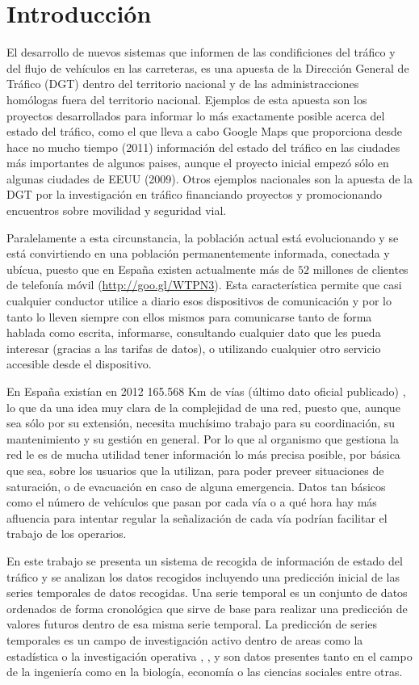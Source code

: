 \documentclass[runningheads]{llncs}
\begin{document}
\section{Introducci\'on}
\noindent 
El desarrollo de nuevos sistemas que informen de las condificiones del tráfico y del flujo de
veh\'iculos en las carreteras, es una apuesta de la Dirección General de Tráfico (DGT) dentro del
territorio nacional y de las administracciones homólogas fuera del territorio nacional. Ejemplos de
esta apuesta son los proyectos desarrollados para informar lo más exactamente posible
acerca del estado del tráfico, como el que lleva a cabo Google Maps que proporciona desde hace no
mucho tiempo (2011) información del estado del tráfico en las ciudades más importantes de algunos
paises, aunque el proyecto inicial empezó sólo en algunas ciudades de EEUU (2009). Otros ejemplos
nacionales son la apuesta de la DGT por la investigación en tráfico financiando proyectos y
promocionando encuentros sobre movilidad y seguridad vial.  

Paralelamente a esta circunstancia, la población actual está evolucionando y se está convirtiendo
en una población permanentemente informada, conectada y ubícua, puesto que en España existen
actualmente más de $52$ millones de clientes de telefonía móvil
(\url{http://goo.gl/WTPN3}). Esta característica permite que casi cualquier
conductor utilice a diario esos dispositivos de comunicación y por lo tanto lo lleven siempre con
ellos mismos para comunicarse tanto de forma hablada como escrita, informarse, consultando
cualquier dato que les pueda interesar (gracias a las tarifas de datos), o utilizando cualquier
otro servicio accesible desde el dispositivo. 

En España existían en 2012 165.568  Km de vías (último dato oficial publicado)
\cite{DatosTrafico2012}, lo que da una idea muy clara de la complejidad de una red, puesto que,
aunque sea sólo por su extensión, necesita muchísimo trabajo para su coordinación, su mantenimiento y
su gestión en general. Por lo que al organismo que gestiona la red le es de mucha
utilidad tener información lo más precisa posible, por básica que sea, sobre los usuarios que la
utilizan, para poder preveer situaciones de saturación, o de evacuación en caso de alguna
emergencia. Datos tan básicos como el número de vehículos que pasan por cada vía o a qué hora hay más
afluencia para intentar regular la señalización de cada vía podrían facilitar el trabajo de los
operarios.

En este trabajo se presenta un sistema de recogida de información de estado del tráfico y se
analizan los datos recogidos incluyendo una predicción inicial de las series temporales de datos
recogidas. Una serie temporal es un conjunto de datos
ordenados de forma cronológica que sirve de base para realizar una predicción de valores futuros
dentro de esa misma serie temporal. La predicción de series temporales es un campo de investigación
activo dentro de areas como la estadística o la investigación operativa \cite{Fildes2008},
\cite{Gooijer25years}, y son datos presentes tanto en el campo de la ingeniería como en la
biología, economía o las ciencias sociales entre otras.
\end{document}
